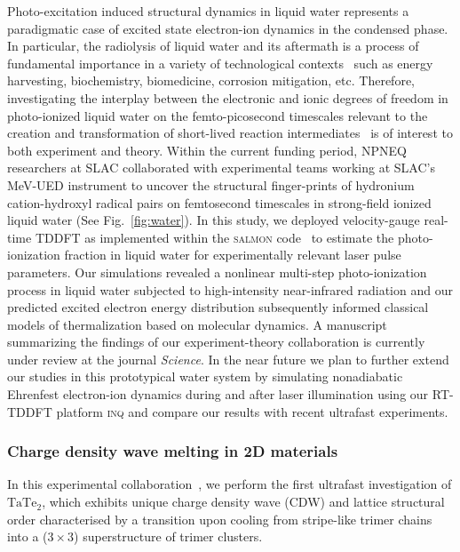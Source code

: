 Photo-excitation induced structural dynamics in liquid water represents a paradigmatic case of excited state electron-ion dynamics in the condensed phase. 
In particular, the radiolysis of liquid water and its aftermath is a process of fundamental importance in a variety of technological contexts~\cite{Garrett2005} such as energy harvesting, biochemistry, biomedicine, corrosion mitigation, etc. 
Therefore, investigating the interplay between the electronic and ionic degrees of freedom in photo-ionized liquid water on the femto-picosecond timescales relevant to the creation and transformation of short-lived reaction intermediates~\cite{Loh2020} is of interest to both experiment and theory.
Within the current funding period, NPNEQ researchers at SLAC collaborated with experimental teams working at SLAC's MeV-UED instrument to uncover the structural finger-prints of hydronium cation-hydroxyl radical pairs on femtosecond timescales in strong-field ionized liquid water (See Fig.~\ref{fig:water}). 
In this study, we deployed velocity-gauge real-time TDDFT as implemented within the \textsc{salmon} code~\cite{salmon} to estimate the photo-ionization fraction in liquid water for experimentally relevant laser pulse parameters. 
Our simulations revealed a nonlinear multi-step photo-ionization process in liquid water subjected to high-intensity near-infrared radiation and our predicted excited electron energy distribution subsequently informed classical models of thermalization based on molecular dynamics. 
A manuscript summarizing the findings of our experiment-theory collaboration is currently under review at the journal \emph{Science}.
In the near future we plan to further extend our studies in this prototypical water system by simulating nonadiabatic Ehrenfest electron-ion dynamics during and after laser illumination using our RT-TDDFT platform \textsc{inq} and compare our results with recent ultrafast experiments. 


\subsubsection{Charge density wave melting in 2D materials}

In this experimental collaboration~\cite{Siddiqui2020}, we perform the first ultrafast investigation of \(\mathrm{TaTe_2}\), which exhibits unique charge density wave (CDW) and lattice structural order characterised by a transition upon cooling from stripe-like trimer chains into a (\(3\times 3\)) superstructure of trimer clusters. 

